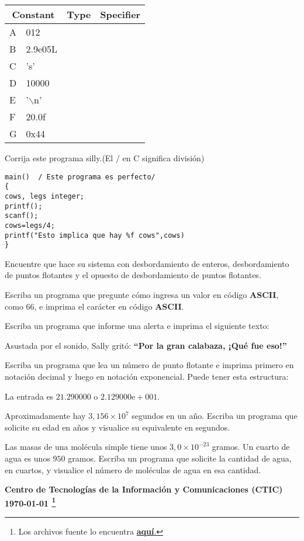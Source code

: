 \documentclass[spanish,addpoints,answers,a4paper]{exam}
\newcommand{\unmarkedfntext}[1]{%
	\begingroup
	\renewcommand\thefootnote{}\footnote{#1}%
	\addtocounter{footnote}{-1}%
	\endgroup
}
\begin{document}
\begin{questions}
\begin{table}[H]
	\centering
\begin{tabular}{|l|l|c|c|}
	\hline
	\multicolumn{2}{|c|}{\bfseries Constant} & \textbf{Type} & \textbf{Specifier}	\\
	\hline
	A	&	012 	& 	& 	\\
	\hline
	B 	&	2.9e05L	&	&	\\
	\hline
	C	&	's'		& 	&	\\
	\hline
	D	&	10000 	& 	&	\\
	\hline
	E	&	'$\backslash$n' &	&	\\
	\hline
	F	&	20.0f	&	&	\\
	\hline
	G	&	0x44	&	&	\\
	\hline
\end{tabular}
\end{table}

\question Corrija este programa silly.\qquad(El / en C significa división)

\begin{verbatim}
main()	/ Este programa es perfecto/
{
cows, legs integer;
printf();
scanf();
cows=legs/4;
printf("Esto implica que hay %f cows",cows)
}
\end{verbatim}

\question Encuentre que hace su sistema con desbordamiento de enteros, desbordamiento de puntos flotantes y el opuesto de desbordamiento de puntos flotantes.

\question Escriba un programa que pregunte cómo ingresa un valor en código \textbf{ASCII}, como $66$, e imprima el carácter en código \textbf{ASCII}.

\question Escriba un programa que informe una alerta e imprima el siguiente texto:

Asustada por el sonido, Sally gritó: \textbf{``Por la gran calabaza, ¡Qué fue eso!''}

\question Escriba un programa que lea un número de punto flotante e imprima primero en notación decimal y luego en notación exponencial. Puede tener esta estructura:

La entrada es $21.290000$ o $2.129000\text{e}+001$.

\question Aproximadamente hay $3,156\times10^{7}$ segundos en un año. Escriba un programa que solicite su edad en años y visualice su equivalente en segundos.

\question Las masas de una molécula simple tiene unos $3,0\times10^{-23}$ gramos. Un cuarto de agua es unos $950$ gramos. Escriba un programa que solicite la cantidad de agua, en cuartos, y visualice el número de moléculas de agua en esa cantidad. 
\end{questions}
\begin{flushright}\bfseries
Centro de Tecnologías de la Información y Comunicaciones (CTIC)\\[2mm]
\today\unmarkedfntext{Los archivos fuente lo encuentra  \href{https://github.com/carlosal1015/C-Programming}{\textbf{aquí}.}}
\end{flushright}
\end{document}
